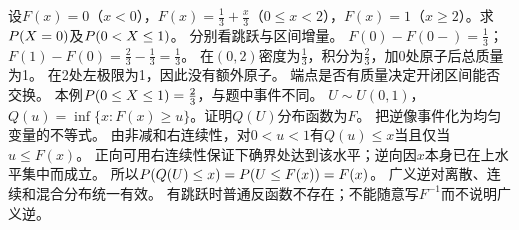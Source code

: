 {设$F(x)=0$（$x<0$），$F(x)=\frac{1}{3}+\frac{x}{3}$（$0\le x<2$），$F(x)=1$（$x\ge2$）。求$P(X=0)$及$P(0<X\le1)$。}
{分别看跳跃与区间增量。}
{$F(0)-F(0-)=\frac{1}{3}$；$F(1)-F(0)=\frac{2}{3}-\frac{1}{3}=\frac{1}{3}$。
在$(0,2)$密度为$\frac{1}{3}$，积分为$\frac{2}{3}$，加0处原子后总质量为1。
在2处左极限为1，因此没有额外原子。}
{端点是否有质量决定开闭区间能否交换。}
{本例$P(0\le X\le1)=\frac{2}{3}$，与题中事件不同。}
{$U\sim U(0,1)$，$Q(u)=\inf\{x:F(x)\ge u\}$。证明$Q(U)$分布函数为$F$。}
{把逆像事件化为均匀变量的不等式。}
{由非减和右连续性，对$0<u<1$有$Q(u)\le x$当且仅当$u\le F(x)$。
正向可用右连续性保证下确界处达到该水平；逆向因$x$本身已在上水平集中而成立。
所以$P(Q(U)\le x)=P(U\le F(x))=F(x)$。}
{广义逆对离散、连续和混合分布统一有效。}
{有跳跃时普通反函数不存在；不能随意写$F^{-1}$而不说明广义逆。}

